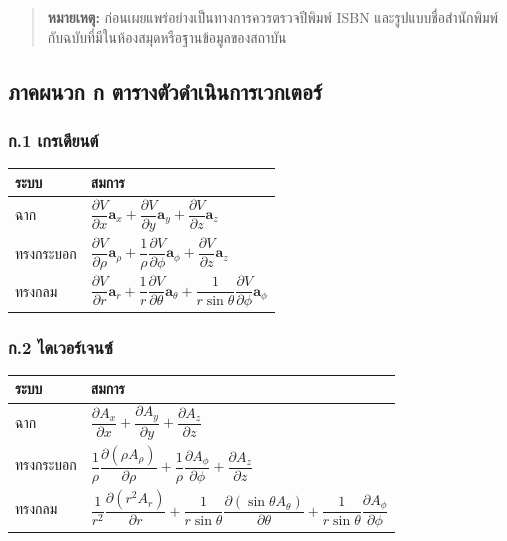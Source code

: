 \begin{quote}
\textbf{หมายเหตุ:} ก่อนเผยแพร่อย่างเป็นทางการควรตรวจปีพิมพ์ ISBN และรูปแบบชื่อสำนักพิมพ์กับฉบับที่มีในห้องสมุดหรือฐานข้อมูลของสถาบัน
\end{quote}

\subsection{ภาคผนวก ก ตารางตัวดำเนินการเวกเตอร์}

\subsubsection{ก.1 เกรเดียนต์}

\begin{table}[htbp]
    \centering
    \begin{tabular}{l l}
        \hline
        \textbf{ระบบ} & \textbf{สมการ} \\
        \hline
        ฉาก & \(\dfrac{\partial V}{\partial x}\mathbf{a}_x+\dfrac{\partial V}{\partial y}\mathbf{a}_y+\dfrac{\partial V}{\partial z}\mathbf{a}_z\) \\
        ทรงกระบอก & \(\dfrac{\partial V}{\partial\rho}\mathbf{a}_\rho+\dfrac{1}{\rho}\dfrac{\partial V}{\partial\phi}\mathbf{a}_\phi+\dfrac{\partial V}{\partial z}\mathbf{a}_z\) \\
        ทรงกลม & \(\dfrac{\partial V}{\partial r}\mathbf{a}_r+\dfrac{1}{r}\dfrac{\partial V}{\partial\theta}\mathbf{a}_\theta+\dfrac{1}{r\sin\theta}\dfrac{\partial V}{\partial\phi}\mathbf{a}_\phi\) \\
        \hline
    \end{tabular}
\end{table}

\subsubsection{ก.2 ไดเวอร์เจนซ์}

\begin{table}[htbp]
    \centering
    \begin{tabular}{l l}
        \hline
        \textbf{ระบบ} & \textbf{สมการ} \\
        \hline
        ฉาก & \(\dfrac{\partial A_x}{\partial x}+\dfrac{\partial A_y}{\partial y}+\dfrac{\partial A_z}{\partial z}\) \\
        ทรงกระบอก & \(\dfrac{1}{\rho}\dfrac{\partial(\rho A_\rho)}{\partial\rho}+\dfrac{1}{\rho}\dfrac{\partial A_\phi}{\partial\phi}+\dfrac{\partial A_z}{\partial z}\) \\
        ทรงกลม & \(\dfrac{1}{r^2}\dfrac{\partial(r^2A_r)}{\partial r}+\dfrac{1}{r\sin\theta}\dfrac{\partial(\sin\theta A_\theta)}{\partial\theta}+\dfrac{1}{r\sin\theta}\dfrac{\partial A_\phi}{\partial\phi}\) \\
        \hline
    \end{tabular}
\end{table}


